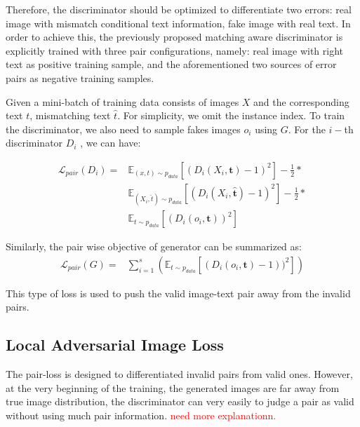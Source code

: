 \documentclass[10pt,twocolumn,letterpaper]{article}
\begin{document}
Therefore, the discriminator should be optimized to differentiate two errors: real image with mismatch conditional text information, fake image with real text. In order to achieve this, the previously proposed matching aware discriminator is explicitly trained with three pair configurations, namely: real image with right text as positive training sample, and the aforementioned two sources of error pairs as negative training samples. 

Given a mini-batch of training data consists of images $X$ and the corresponding text $t$, mismatching text $\hat{t}$. For simplicity, we omit the instance index.  To train the discriminator,  we also need to sample fakes images $o_i$ using $G$. For the $i-$th discriminator $D_i$ , we can have:

\begin{equation}
\label{equ:matchignloss}
\begin{split}
\mathcal{L}_{pair}(D_i)  = & \mathbb{E}_{(x, t) \sim p_{data}}[(D_i( {X_i},  \bm{t}) - 1) ^ 2 ] - \frac{1}{2}*\\ 
&   \mathbb{E}_{(X_i, \hat{t}) \sim p_{data}}[(D_i({X_i}, \hat{\bm{t}}) - 1)^2  ] - \frac{1}{2} *\\
&   \mathbb{E}_{t \sim p_{data}}[ (D_i( {o}_i, \bm{t}))^2 ]  
\end{split}
\end{equation}

Similarly, the pair wise objective of generator can be summarized as:
\begin{equation}
\label{equ:pariG}
\begin{split}
\mathcal{L}_{pair}(G)  = & \sum_{i=1}^{s} ( \mathbb{E}_{t \sim p_{data}}[ (D_i( {o}_i, \bm{t}) - 1) )^2 ] )
\end{split}
\end{equation}

This type of loss is used to push the valid image-text pair away from the invalid pairs.

\subsection{Local Adversarial Image Loss}

The pair-loss is designed to differentiated invalid pairs from valid ones. However, at the very beginning of the training, the generated images are far away from true image distribution, the discriminator can very easily to judge a pair as valid without using much pair information. \textcolor{red}{need more explanationn.}
\end{document}
